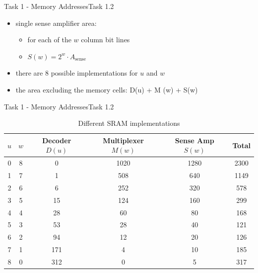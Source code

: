 {\begin{frame}[allowframebreaks]{Task 1 - Memory Addresses}{Task 1.2\vspace{0.25cm}}
\begin{itemize}
\begin{itemize}
    \end{itemize}
    \item \alert{single sense amplifier area:}
    \begin{itemize}
      \item for each of the $w$ \alert{column bit lines}
      \item $S(w)=2^w \cdot A_{\text {sense}}$
    \end{itemize}
    \item there are $8$ possible \alert{implementations} for $u$ and $w$
    \item the area \alert{excluding} the memory cells: D(u) + M (w) + S(w)
  \end{itemize}
\end{frame}

\begin{frame}{Task 1 - Memory Addresses}{Task 1.2\vspace{0.25cm}}
  \centering
 \begin{table}
   \begin{tabular}{|c|c||c|c|c|c|}
      \hline$u$ & $w$ & Decoder $D(u)$ & Multiplexer $M(w)$ & Sense Amp $S(w)$ & Total \\
      \hline \hline 0 & 8 & 0 & 1020 & 1280 & 2300 \\
      \hline 1 & 7 & 1 & 508 & 640 & 1149 \\
      \hline 2 & 6 & 6 & 252 & 320 & 578 \\
      \hline 3 & 5 & 15 & 124 & 160 & 299 \\
      \hline 4 & 4 & 28 & 60 & 80 & 168 \\
      \hline 5 & 3 & 53 & 28 & 40 & 121 \\
      \hline 6 & 2 & 94 & 12 & 20 & 126 \\
      \hline 7 & 1 & 171 & 4 & 10 & 185 \\
      \hline 8 & 0 & 312 & 0 & 5 & 317 \\
      \hline
    \end{tabular}
    \caption{Different SRAM implementations}
 \end{table}
\end{frame}
}\fi
